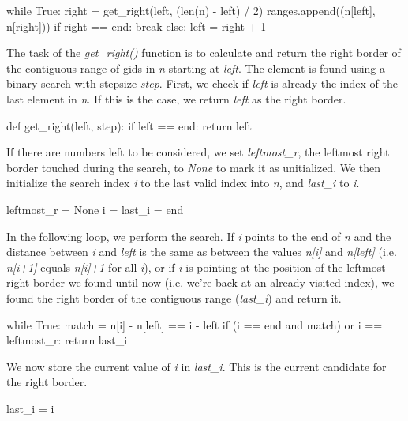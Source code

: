 \documentclass{frontiersSCNS} %
\begin{document}
\begin{pythoncode}
while True:
    right = get_right(left, (len(n) - left) / 2)
    ranges.append((n[left], n[right]))
    if right == end:
        break
    else:
        left = right + 1
\end{pythoncode}

The task of the \emph{get\_right()} function is to calculate and
return the right border of the contiguous range of gids in \emph{n}
starting at \emph{left}. The element is found using a binary search
with stepsize \emph{step}. First, we check if \emph{left} is already
the index of the last element in \emph{n}. If this is the case, we
return \emph{left} as the right border.

\begin{pythoncode}
def get_right(left, step):
    if left == end:
        return left
\end{pythoncode}

If there are numbers left to be considered, we set \emph{leftmost\_r},
the leftmost right border touched during the search, to \emph{None} to
mark it as unitialized. We then initialize the search index \emph{i}
to the last valid index into \emph{n}, and \emph{last\_i} to \emph{i}.

\begin{pythoncode}
    leftmost_r = None
    i = last_i = end
\end{pythoncode}

In the following loop, we perform the search. If \emph{i} points to
the end of \emph{n} and the distance between \emph{i} and \emph{left}
is the same as between the values \emph{n[i]} and \emph{n[left]}
(i.e. \emph{n[i+1]} equals \emph{n[i]+1} for all \emph{i}), or if
\emph{i} is pointing at the position of the leftmost right border we
found until now (i.e. we're back at an already visited index), we
found the right border of the contiguous range (\emph{last\_i}) and
return it.

\begin{pythoncode}
    while True:
        match = n[i] - n[left] == i - left
        if (i == end and match) or i == leftmost_r:
            return last_i
\end{pythoncode}

We now store the current value of \emph{i} in \emph{last\_i}. This is
the current candidate for the right border.

\begin{pythoncode}
        last_i = i 
\end{pythoncode}
\end{document}
